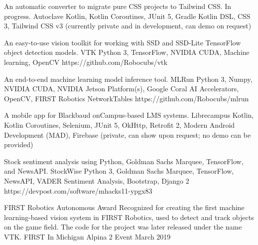 \documentclass[]{awesome-cv}
\begin{document}
\begin{cventries}
	\cventry
	{An automatic converter to migrate pure CSS projects to Tailwind CSS. In progress.}
	{Autoclave}
	{Kotlin, Kotlin Coroutines, JUnit 5, Gradle Kotlin DSL, CSS 3, Tailwind CSS v3}
	{(currently private and in development, can demo on request)}
	{}
	
	\vspace{-5mm}
	\cventry
	{An easy-to-use vision toolkit for working with SSD and SSD-Lite TensorFlow object detection models.}
	{VTK}
	{Python 3, TensorFlow, NVIDIA CUDA, Machine learning, OpenCV}
	{https://github.com/Robocubs/vtk}
	{}
	
	\vspace{-5mm}
	\cventry
	{An end-to-end machine learning model inference tool.}
	{MLRun}
	{Python 3, Numpy, NVIDIA CUDA, NVIDIA Jetson Platform(s), Google Coral AI Accelerators, OpenCV, FIRST Robotics NetworkTables}
	{https://github.com/Robocubs/mlrun}
	{}
	
	\vspace{-5mm}
	\cventry
	{A mobile app for Blackbaud onCampus-based LMS systems.}
	{Librecampus}
	{Kotlin, Kotlin Coroutines, Selenium, JUnit 5, OkHttp, Retrofit 2, Modern Android Development (MAD), Firebase}
	{(private, can show upon request; no demo can be provided)}
	{}
	
	\vspace{-5mm}
	\cventry
	{Stock sentiment analysis using Python, Goldman Sachs Marquee, TensorFlow, and NewsAPI.}
	{StockWise}
	{Python 3, Goldman Sachs Marquee, TensorFlow, NewsAPI, VADER Sentiment Analysis, Bootstrap, Django 2}
	{https://devpost.com/software/mhacks11-ypgx83}
	{}
	
	\vspace{-5mm}
\end{cventries}
\begin{cvhonors}
	\cvhonor
	{FIRST Robotics Autonomous Award}
	{Recognized for creating the first machine learning-based vision system in FIRST Robotics, used to detect and track objects on the game field. The code for the project was later released under the name VTK.}
	{FIRST In Michigan Alpina 2 Event}
	{March 2019}
\end{cvhonors}
\ 
\end{document}

